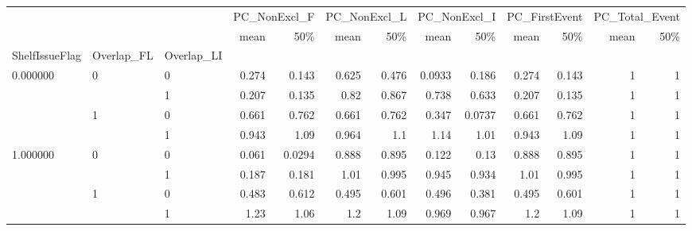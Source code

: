 \begin{tabular}{lllrrrrrrrrrr}
\toprule
 &  &  & \multicolumn{2}{r}{PC\_NonExcl\_F} & \multicolumn{2}{r}{PC\_NonExcl\_L} & \multicolumn{2}{r}{PC\_NonExcl\_I} & \multicolumn{2}{r}{PC\_FirstEvent} & \multicolumn{2}{r}{PC\_Total\_Event} \\
 &  &  & mean & 50\% & mean & 50\% & mean & 50\% & mean & 50\% & mean & 50\% \\
ShelfIssueFlag & Overlap_FL & Overlap_LI &  &  &  &  &  &  &  &  &  &  \\
\midrule
\multirow[t]{4}{*}{0.000000} & \multirow[t]{2}{*}{0} & 0 & 0.274 & 0.143 & 0.625 & 0.476 & 0.0933 & 0.186 & 0.274 & 0.143 & 1 & 1 \\
 &  & 1 & 0.207 & 0.135 & 0.82 & 0.867 & 0.738 & 0.633 & 0.207 & 0.135 & 1 & 1 \\
\cline{2-13}
 & \multirow[t]{2}{*}{1} & 0 & 0.661 & 0.762 & 0.661 & 0.762 & 0.347 & 0.0737 & 0.661 & 0.762 & 1 & 1 \\
 &  & 1 & 0.943 & 1.09 & 0.964 & 1.1 & 1.14 & 1.01 & 0.943 & 1.09 & 1 & 1 \\
\cline{1-13} \cline{2-13}
\multirow[t]{4}{*}{1.000000} & \multirow[t]{2}{*}{0} & 0 & 0.061 & 0.0294 & 0.888 & 0.895 & 0.122 & 0.13 & 0.888 & 0.895 & 1 & 1 \\
 &  & 1 & 0.187 & 0.181 & 1.01 & 0.995 & 0.945 & 0.934 & 1.01 & 0.995 & 1 & 1 \\
\cline{2-13}
 & \multirow[t]{2}{*}{1} & 0 & 0.483 & 0.612 & 0.495 & 0.601 & 0.496 & 0.381 & 0.495 & 0.601 & 1 & 1 \\
 &  & 1 & 1.23 & 1.06 & 1.2 & 1.09 & 0.969 & 0.967 & 1.2 & 1.09 & 1 & 1 \\
\cline{1-13} \cline{2-13}
\bottomrule
\end{tabular}
